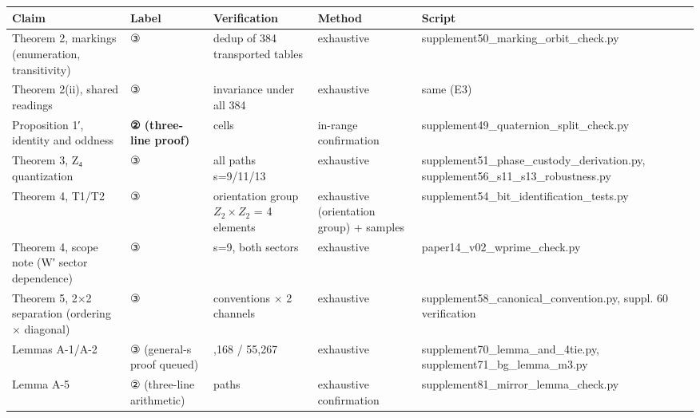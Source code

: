\documentclass[
]{ltjsarticle}
\newcounter{none} %
\begin{document}
{\def\LTcaptype{none} %
\begin{longtable}[]{@{}
  >{\raggedright\arraybackslash}p{}
  >{\raggedright\arraybackslash}p{}
  >{\raggedright\arraybackslash}p{}
  >{\raggedright\arraybackslash}p{}
  >{\raggedright\arraybackslash}p{}@{}}
\toprule\noalign{}
\begin{minipage}[b]{\linewidth}\raggedright
Claim
\end{minipage} & \begin{minipage}[b]{\linewidth}\raggedright
Label
\end{minipage} & \begin{minipage}[b]{\linewidth}\raggedright
Verification
\end{minipage} & \begin{minipage}[b]{\linewidth}\raggedright
Method
\end{minipage} & \begin{minipage}[b]{\linewidth}\raggedright
Script
\end{minipage} \\
\midrule\noalign{}
\endhead
\bottomrule\noalign{}
\endlastfoot
Theorem 2, markings (enumeration, transitivity) & ③ & dedup of 384
transported tables & exhaustive &
supplement50\_marking\_orbit\_check.py \\
Theorem 2(ii), shared readings & ③ & invariance under all 384 &
exhaustive & same (E3) \\
Proposition 1′, identity and oddness & \textbf{② (three-line proof)} &
6561 cells & in-range confirmation &
supplement49\_quaternion\_split\_check.py \\
Theorem 3, Z₄ quantization & ③ & all paths s=9/11/13 & exhaustive &
supplement51\_phase\_custody\_derivation.py,
supplement56\_s11\_s13\_robustness.py \\
Theorem 4, T1/T2 & ③ & orientation group \(Z_2\times Z_2\) = 4 elements
& exhaustive (orientation group) + samples &
supplement54\_bit\_identification\_tests.py \\
Theorem 4, scope note (W′ sector dependence) & ③ & s=9, both sectors &
exhaustive & paper14\_v02\_wprime\_check.py \\
Theorem 5, 2×2 separation (ordering × diagonal) & ③ & 4 conventions × 2
channels & exhaustive & supplement58\_canonical\_convention.py, suppl.
60 verification \\
Lemmas A-1/A-2 & ③ (general-s proof queued) & 103,168 / 55,267 &
exhaustive & supplement70\_lemma\_and\_4tie.py,
supplement71\_bg\_lemma\_m3.py \\
Lemma A-5 & ② (three-line arithmetic) & 394 paths & exhaustive
confirmation & supplement81\_mirror\_lemma\_check.py \\
\end{longtable}
}
\end{document}
